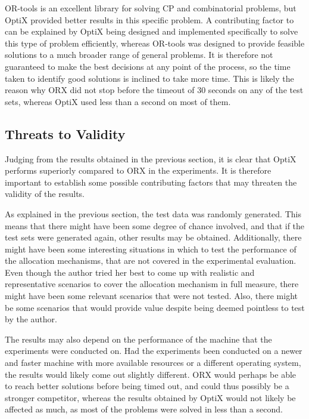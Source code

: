 OR-tools is an excellent library for solving CP and combinatorial problems, but OptiX provided better results in this specific problem. A contributing factor to can be explained by OptiX being designed and implemented specifically to solve this type of problem efficiently, whereas OR-tools was designed to provide feasible solutions to a much broader range of general problems. It is therefore not guaranteed to make the best decisions at any point of the process, so the time taken to identify good solutions is inclined to take more time. This is likely the reason why ORX did not stop before the timeout of 30 seconds on any of the test sets, whereas OptiX used less than a second on most of them.

\subsection{Threats to Validity}

Judging from the results obtained in the previous section, it is clear that OptiX performs superiorly compared to ORX in the experiments. It is therefore important to establish some possible contributing factors that may threaten the validity of the results.

As explained in the previous section, the test data was randomly generated. This means that there might have been some degree of chance involved, and that if the test sets were generated again, other results may be obtained. Additionally, there might have been some interesting situations in which to test the performance of the allocation mechanisms, that are not covered in the experimental evaluation. Even though the author tried her best to come up with realistic and representative scenarios to cover the allocation mechanism in full measure, there might have been some relevant scenarios that were not tested. Also, there might be some scenarios that would provide value despite being deemed pointless to test by the author.

The results may also depend on the performance of the machine that the experiments were conducted on. Had the experiments been conducted on a newer and faster machine with more available resources or a different operating system, the results would likely come out slightly different. ORX would perhaps be able to reach better solutions before being timed out, and could thus possibly be a stronger competitor, whereas the results obtained by OptiX would not likely be affected as much, as most of the problems were solved in less than a second.

